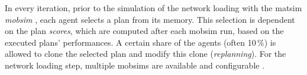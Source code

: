 In every iteration, prior to the simulation of the network loading with the \gls{matsim} \emph{\gls{mobsim}} \citep[e.g.,][]{Cetin_PhDThesis_2005}, each agent selects a plan from its memory. This selection is dependent on the plan \emph{scores}, which are computed after each mobsim run, based on the executed plans' performances. A certain share of the agents 
(often 10\,\%) is allowed to clone the selected plan and modify this clone (\emph{\gls{replanning}}).
For the network loading 
step, multiple \glspl{mobsim} are available and configurable \citep[see][also see Section~\ref{sec:using-mobsims} of this book]{HorniEtAl_TechRep_IVT_2011_a}.

